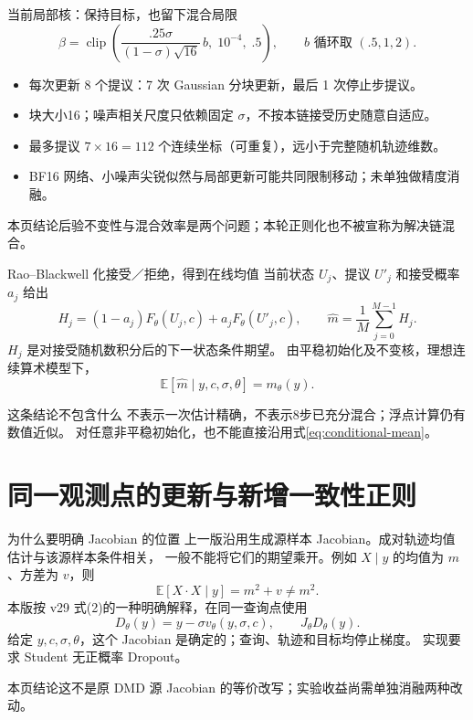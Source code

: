 \documentclass[10pt,aspectratio=169]{beamer}
\newcommand{\E}{\mathbb E}
\newcommand{\takeaway}[1]{\begin{exampleblock}{本页结论}\small #1\end{exampleblock}}
\begin{document}
\begin{frame}{当前局部核：保持目标，也留下混合局限}
\small
\begin{equation}
\beta=\operatorname{clip}\left(
\frac{.25\sigma}{(1-\sigma)\sqrt{16}}\,b,\;10^{-4},\;.5\right),
\qquad b\text{ 循环取 }(.5,1,2).
\end{equation}
\begin{itemize}\itemsep3pt
\item 每次更新 8 个提议：7 次 Gaussian 分块更新，最后 1 次停止步提议。
\item 块大小16；噪声相关尺度只依赖固定 $\sigma$，不按本链接受历史随意自适应。
\item 最多提议 $7\times16=112$ 个连续坐标（可重复），远小于完整随机轨迹维数。
\item BF16 网络、小噪声尖锐似然与局部更新可能共同限制移动；未单独做精度消融。
\end{itemize}
\takeaway{后验不变性与混合效率是两个问题；本轮正则化也不被宣称为解决链混合。}
\end{frame}

\begin{frame}{Rao--Blackwell 化接受／拒绝，得到在线均值}
\small
当前状态 $U_j$、提议 $U'_j$ 和接受概率 $a_j$ 给出
\begin{equation}
H_j=(1-a_j)F_\theta(U_j,c)+a_jF_\theta(U'_j,c),\qquad
\widehat m=\frac1M\sum_{j=0}^{M-1}H_j.
\end{equation}
$H_j$ 是对接受随机数积分后的下一状态条件期望。
由平稳初始化及不变核，理想连续算术模型下，
\begin{equation}\label{eq:conditional-mean}
\E[\widehat m\mid y,c,\sigma,\theta]=m_\theta(y).
\end{equation}
\begin{alertblock}{这条结论不包含什么}
不表示一次估计精确，不表示8步已充分混合；浮点计算仍有数值近似。
对任意非平稳初始化，也不能直接沿用式\eqref{eq:conditional-mean}。
\end{alertblock}
\end{frame}

\section{同一观测点的更新与新增一致性正则}
\begin{frame}{为什么要明确 Jacobian 的位置}
\small
上一版沿用生成源样本 Jacobian。成对轨迹均值估计与该源样本条件相关，
一般不能将它们的期望乘开。例如 $X\mid y$ 的均值为 $m$、方差为 $v$，则
\begin{equation}
\E[X\cdot X\mid y]=m^2+v\ne m^2.
\end{equation}
本版按 v29 式(2)的一种明确解释，在同一查询点使用
\begin{equation}\label{eq:denoiser}
D_\theta(y)=y-\sigma v_\theta(y,\sigma,c),\qquad J_\theta D_\theta(y).
\end{equation}
给定 $y,c,\sigma,\theta$，这个 Jacobian 是确定的；查询、轨迹和目标均停止梯度。
实现要求 Student 无正概率 Dropout。
\takeaway{这不是原 DMD 源 Jacobian 的等价改写；实验收益尚需单独消融两种改动。}
\end{frame}
\end{document}
